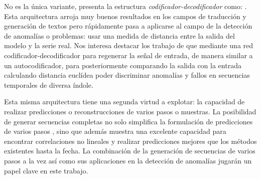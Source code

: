 No es la única variante, \citeauthor{Cho2014} presenta la estructura \textit{codificador-decodificador} como: . Esta arquitectura arroja muy buenos resultados en los campos de traducción y generación de textos \cite{cho2014,cho2014b,Serban2017,Tran2017} pero rápidamente pasa a aplicarse al campo de la detección de anomalías o problemas: usar una medida de distancia entre la salida del modelo y la serie real\cite{Wang2018,malhotra2016,Park2018,Wang2020}. Nos interesa destacar los trabajo de  que mediante una red codificador-decodificador para regenerar la señal de entrada, de manera similar a un autocodificador, para posteriormente comparando la salida con la entrada calculando distancia euclídea poder discriminar anomalías y fallos en secuencias temporales de diversa índole.

  Esta misma arquitectura tiene una segunda virtud a explotar: la capacidad de realizar predicciones o reconstrucciones de varios pasos o muestras\cite{Peng2018}. La posibilidad de generar secuencias completas no solo simplifica la formulación de predicciones de varios pasos \cite{Kao2020}, sino que además muestra una excelente capacidad para encontrar correlaciones no lineales y realizar predicciones mejores que los métodos existentes hasta la fecha\cite{Peng2018,Du2019,Kao2020}. La combinación de la generación de secuencias de varios pasos a la vez así como sus aplicaciones en la detección de anomalías jugarán un papel clave en este trabajo.



